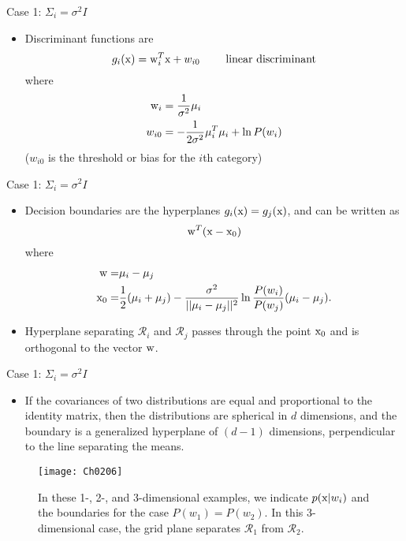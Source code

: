 \begin{frame}{Case 1: $\Sigma_i=\sigma^2 I$}
\begin{itemize}
\item Discriminant functions are
\[{g_i}({\rm x}) = \textbf{\rm w}_i^T{\rm x} + {w_{i0}}~~~~~~~\text{linear discriminant}\]
where
\begin{align*}
{\rm w}_i&=\frac{1}{\sigma^2}\mu_i\\
w_{i0}&=-\frac{1}{2\sigma^2}\mu^T_i\mu_i+\ln P(w_i)
\end{align*}
($w_{i0}$ is the threshold or bias for the $i$th category)
\end{itemize}
\end{frame}

\begin{frame}{Case 1: $\Sigma_i=\sigma^2 I$}
\begin{itemize}
\item Decision boundaries are the hyperplanes $g_i({\rm x})=g_j({\rm x})$, and can be written as 
\[{\rm w}^T({\rm x}-{\rm x}_0)\]
where
\begin{align*}
{\rm w}=&\mu_i-\mu_j\\
{\rm x}_0=&\frac{1}{2}(\mu_i+\mu_j)-\frac{\sigma^2}{||\mu_i-\mu_j||^2}\ln \frac{P(w_i)}{P(w_j)}(\mu_i-\mu_j).
\end{align*}
\item Hyperplane separating $\mathcal{R}_i$ and $\mathcal{R}_j$ passes through the point ${\rm x}_0$ and is orthogonal to the vector ${\rm w}$.
\end{itemize}
\end{frame}

\begin{frame}{Case 1: $\Sigma_i=\sigma^2 I$}
\begin{itemize}
\item If the covariances of two distributions are equal and proportional to the identity matrix, then the distributions are spherical in $d$ dimensions, and the boundary is a generalized hyperplane of $(d-1)$ dimensions, perpendicular to the line separating the means.
\end{itemize}
\begin{figure}
\texttt{[image: Ch0206]}
\caption{In these 1-, 2-, and 3-dimensional examples, we indicate $p({\rm x}|w_i)$ and the boundaries for the case $P(w_1)=P(w_2)$. In this 3-dimensional case, the grid plane separates $\mathcal{R}_1$ from $\mathcal{R}_2$.}
\end{figure}
\end{frame}


